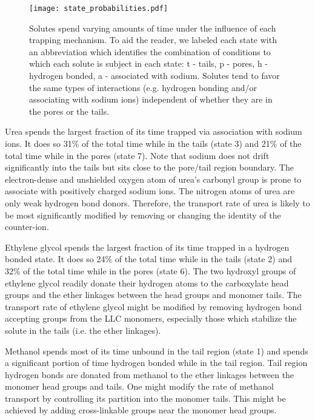 \documentclass[journal=ancac3,manuscript=article,layout=twocolumn]{achemso}
\begin{document}
  \begin{figure}
  \centering
  \texttt{[image: state\_probabilities.pdf]}
  \caption{Solutes spend varying amounts of time under the influence of each
	  trapping mechanism. To aid the reader, we labeled each state with an
	  abbreviation which identifies the combination of conditions to which
	  each solute is subject in each state: t - tails, p - pores, h -
	  hydrogen bonded, a - associated with sodium. Solutes tend to favor
	  the same types of interactions (e.g. hydrogen bonding and/or
	  associating with sodium ions) independent of whether they are in the
	  pores or the tails.}\label{fig:state_probabilities}
  \end{figure}

  Urea spends the largest fraction of its time trapped via association with
  sodium ions. It does so 31\% of the total time while in the tails (state 3)
  and 21\% of the total time while in the pores (state 7). Note that sodium
  does not drift significantly into the tails but sits close to the pore/tail
  region boundary. The electron-dense and unshielded oxygen atom of urea's
  carbonyl group is prone to associate with positively charged sodium ions. The
  nitrogen atoms of urea are only weak hydrogen bond donors. Therefore, the
  transport rate of urea is likely to be most significantly modified by
  removing or changing the identity of the counter-ion.
  
  Ethylene glycol spends the largest fraction of its time trapped in a hydrogen
  bonded state. It does so 24\% of the total time while in the tails (state 2)
  and 32\% of the total time while in the pores (state 6). The two hydroxyl
  groups of ethylene glycol readily donate their hydrogen atoms to the
  carboxylate head groups and the ether linkages between the head groups and
  monomer tails. The transport rate of ethylene glycol might be modified by
  removing hydrogen bond accepting groups from the LLC monomers, especially
  those which stabilize the solute in the tails (i.e. the ether linkages). 
  
  Methanol spends most of its time unbound in the tail region (state 1) and
  spends a significant portion of time hydrogen bonded while in the tail
  region. Tail region hydrogen bonds are donated from methanol to the ether
  linkages between the monomer head groups and tails. One might modify the
  rate of methanol transport by controlling its partition into the monomer
  tails. This might be achieved by adding cross-linkable groups near the
  monomer head groups.
  
\end{document}
